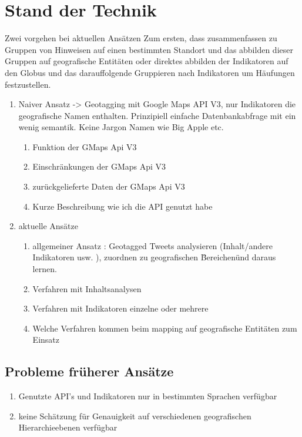 	\section{Stand der Technik}
		Zwei vorgehen bei aktuellen Ansätzen
		Zum ersten, dass zusammenfassen zu Gruppen von Hinweisen auf einen bestimmten Standort und das abbilden dieser Gruppen auf geografische Entitäten oder direktes abbilden der Indikatoren auf den Globus und das darauffolgende Gruppieren nach Indikatoren um Häufungen festzustellen.   
		\begin{enumerate}
			\item Naiver Ansatz -> Geotagging mit Google Maps API V3, nur Indikatoren die geografische Namen enthalten. 
					Prinzipiell einfache Datenbankabfrage mit ein wenig semantik. 
					Keine Jargon Namen wie Big Apple etc.
				\begin{enumerate}
					\item Funktion der GMaps Api V3
					\item Einschränkungen der GMaps Api V3
					\item zurückgelieferte Daten der GMaps Api V3
					\item Kurze Beschreibung wie ich die API genutzt habe
				\end{enumerate}
			\item aktuelle Ansätze
				\begin{enumerate}
					\item{ 
					allgemeiner Ansatz : Geotagged Tweets analysieren (Inhalt/andere Indikatoren usw. ), zuordnen zu geografischen \"Bereichen\" und daraus lernen.}
					\item Verfahren mit Inhaltsanalysen
					\item Verfahren mit Indikatoren einzelne oder mehrere
					\item Welche Verfahren kommen beim mapping auf  geografische Entitäten zum Einsatz
				\end{enumerate}
		\end{enumerate}

		\subsection{Probleme früherer Ansätze}
			\begin{enumerate}
				\item{Genutzte API's und Indikatoren nur in bestimmten Sprachen verfügbar}
				\item{keine Schätzung für Genauigkeit auf verschiedenen geografischen Hierarchieebenen verfügbar}  
			\end{enumerate}
